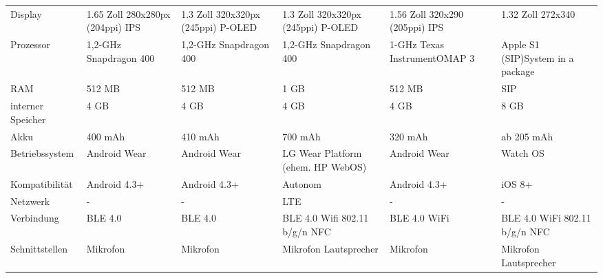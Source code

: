 \begin{landscape}
\begin{longtable}{p{2.8cm}p{3.5cm}p{3.5cm}p{3.5cm}p{3.5cm}p{3.5cm}}
	Display
		& 1.65 Zoll \newline
			280x280px (204ppi) \newline
			IPS
		& 1.3 Zoll \newline
			320x320px (245ppi) \newline
			P-OLED
		& 1.3 Zoll \newline
			320x320px (245ppi) \newline
			P-OLED
		& 1.56 Zoll \newline
			320x290 (205ppi) \newline
			IPS
		& 1.32 Zoll \newline
			272x340 \\
	Prozessor
		& 1,2-GHz \newline Snapdragon 400
		& 1,2-GHz \newline Snapdragon 400
		& 1,2-GHz \newline Snapdragon 400
		& 1-GHz \newline Texas Instrument\newline OMAP 3
		& Apple S1 (SIP)\newline System in a package \\
	RAM
		& 512 MB
		& 512 MB
		& 1 GB
		& 512 MB
		& SIP\\
	interner Speicher
		& 4 GB
		& 4 GB
		& 4 GB
		& 4 GB
		& 8 GB \\
	Akku
		& 400 mAh
		& 410 mAh
		& 700 mAh
		& 320 mAh
		& ab 205 mAh\\
	Betriebssystem
		& Android Wear
		& Android Wear
		& LG Wear Platform \newline (ehem. HP WebOS)
		& Android Wear
		& Watch OS \\
	Kompatibilität
		& Android 4.3+
		& Android 4.3+
		& Autonom
		& Android 4.3+
		& iOS 8+\\
	Netzwerk
		& -
		& -
		& LTE
		& - 
		& -\\
	Verbindung
		& BLE 4.0
		& BLE 4.0
		& BLE 4.0 \newline
			Wifi 802.11 b/g/n \newline
			NFC
		& BLE 4.0 \newline
			WiFi
		& BLE 4.0 \newline
			WiFi 802.11 b/g/n \newline
			NFC \\
	Schnittstellen
		& Mikrofon
		& Mikrofon
		& Mikrofon \newline
			Lautsprecher
		& Mikrofon
		& Mikrofon \newline
			Lautsprecher \\

\end{longtable}
\end{landscape}
